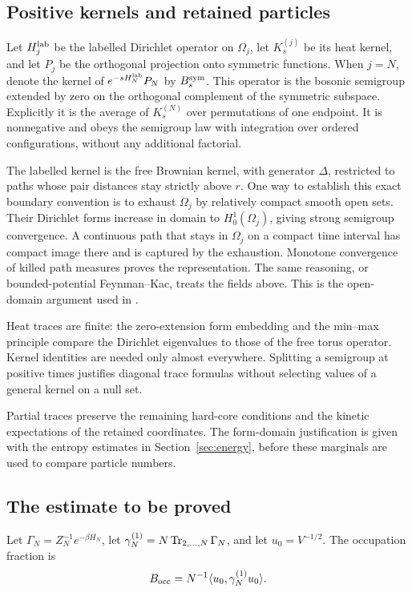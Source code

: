 \subsection{Positive kernels and retained particles}

Let $H_j^{\rm lab}$ be the labelled Dirichlet operator on $\Omega_j$,
let $K_s^{(j)}$ be its heat kernel, and let $P_j$ be the orthogonal
projection onto symmetric functions. When $j=N$, denote the kernel of
$e^{-sH_N^{\rm lab}}P_N$ by $B_s^{\rm sym}$. This operator is the
bosonic semigroup extended by zero on the orthogonal complement of the
symmetric subspace.
Explicitly it is the average of $K_s^{(N)}$ over permutations of one
endpoint. It is nonnegative and obeys the semigroup law with integration
over ordered configurations, without any additional factorial.

The labelled kernel is the free Brownian kernel, with generator
$\Delta$, restricted to paths whose pair distances stay strictly above
$r$. One way to establish this exact boundary convention is to exhaust
$\Omega_j$ by relatively compact smooth open sets. Their Dirichlet forms
increase in domain to $H^1_0(\Omega_j)$, giving strong semigroup
convergence. A continuous path that stays in $\Omega_j$ on a compact time
interval has compact image there and is captured by the exhaustion.
Monotone convergence of killed path measures proves the representation.
The same reasoning, or bounded-potential Feynman--Kac, treats the fields
above. This is the open-domain argument used in \citet[Section~4]{HS}.

Heat traces are finite: the zero-extension form embedding and the
min--max principle compare the Dirichlet eigenvalues to those of the free
torus operator. Kernel identities are needed only almost everywhere.
Splitting a semigroup at positive times justifies diagonal trace formulas
without selecting values of a general kernel on a null set.

Partial traces preserve the remaining hard-core conditions and the kinetic
expectations of the retained coordinates. The form-domain justification is
given with the entropy estimates in Section~\ref{sec:energy}, before these
marginals are used to compare particle numbers.

\subsection{The estimate to be proved}

Let $\Gamma_N=Z_N^{-1}e^{-\beta H_N}$, let
$\gamma_N^{(1)}=N\operatorname{Tr}_{2,\ldots,N}\Gamma_N$, and let $u_0=V^{-1/2}$.
The occupation fraction is
\[
 B_{\rm occ}=N^{-1}\langle u_0,\gamma_N^{(1)}u_0\rangle.
\]

